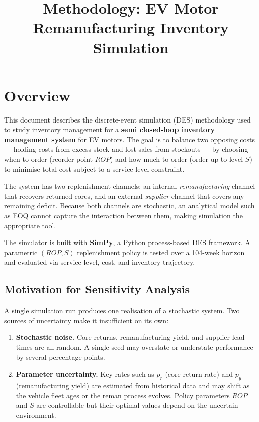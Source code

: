 \documentclass[11pt]{article}
\title{Methodology: EV Motor Remanufacturing Inventory Simulation}
\author{}
\date{}
\begin{document}
\maketitle
\tableofcontents
\bigskip

\section{Overview}

This document describes the discrete-event simulation (DES) methodology used to
study inventory management for a \textbf{semi closed-loop inventory management system} for
EV motors.  The goal is to balance two opposing costs --- holding costs from excess
stock and lost sales from stockouts --- by choosing when to order (reorder point
$ROP$) and how much to order (order-up-to level $S$) to minimise total cost
subject to a service-level constraint.

The system has two replenishment channels: an internal \emph{remanufacturing}
channel that recovers returned cores, and an external \emph{supplier} channel
that covers any remaining deficit.  Because both channels are stochastic, an
analytical model such as EOQ cannot capture the interaction between them, making
simulation the appropriate tool.

The simulator is built with \textbf{SimPy}, a Python process-based DES framework.
A parametric $(ROP, S)$ replenishment policy is tested over a 104-week horizon and
evaluated via service level, cost, and inventory trajectory.

\subsection*{Motivation for Sensitivity Analysis}

A single simulation run produces one realisation of a stochastic system.  Two
sources of uncertainty make it insufficient on its own:

\begin{enumerate}
  \item \textbf{Stochastic noise.}  Core returns, remanufacturing yield, and
    supplier lead times are all random.  A single seed may overstate or understate
    performance by several percentage points.

  \item \textbf{Parameter uncertainty.}  Key rates such as $p_r$ (core return
    rate) and $p_y$ (remanufacturing yield) are estimated from historical data and
    may shift as the vehicle fleet ages or the reman process evolves.  Policy
    parameters $ROP$ and $S$ are controllable but their optimal values depend on
    the uncertain environment.
\end{enumerate}
\end{document}
